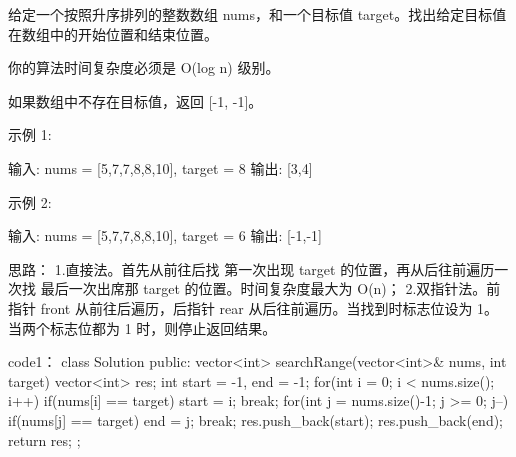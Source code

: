给定一个按照升序排列的整数数组 nums，和一个目标值 target。找出给定目标值在数组中的开始位置和结束位置。

你的算法时间复杂度必须是 O(log n) 级别。

如果数组中不存在目标值，返回 [-1, -1]。

示例 1:

输入: nums = [5,7,7,8,8,10], target = 8
输出: [3,4]

示例 2:

输入: nums = [5,7,7,8,8,10], target = 6
输出: [-1,-1]


























思路：
1.直接法。首先从前往后找 第一次出现 target 的位置，再从后往前遍历一次找 最后一次出席那 target 的位置。时间复杂度最大为 O(n)；
2.双指针法。前指针 front 从前往后遍历，后指针 rear 从后往前遍历。当找到时标志位设为 1。当两个标志位都为 1 时，则停止返回结果。





























code1：
class Solution {
public:
    vector<int> searchRange(vector<int>& nums, int target) {
        vector<int> res;
        int start = -1, end = -1;
        for(int i = 0; i < nums.size(); i++)
        {
            if(nums[i] == target)
            {
                start = i; break;
            }
        }
        for(int j = nums.size()-1; j >= 0; j--)
        {
            if(nums[j] == target)
            {
                end = j; break;
            }
        }
        res.push_back(start);
        res.push_back(end);
        return res;
    }
};



